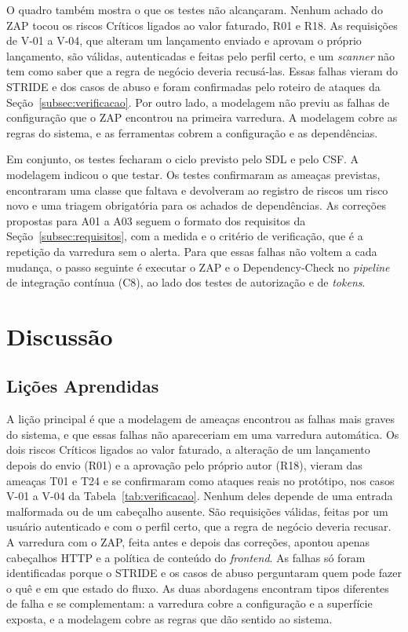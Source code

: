 \documentclass[conference]{IEEEtran}
\begin{document}
O quadro também mostra o que os testes não alcançaram. Nenhum achado do ZAP tocou os riscos Críticos ligados ao valor faturado, R01 e R18. As requisições de V-01 a V-04, que alteram um lançamento enviado e aprovam o próprio lançamento, são válidas, autenticadas e feitas pelo perfil certo, e um \textit{scanner} não tem como saber que a regra de negócio deveria recusá-las. Essas falhas vieram do STRIDE e dos casos de abuso e foram confirmadas pelo roteiro de ataques da Seção~\ref{subsec:verificacao}. Por outro lado, a modelagem não previu as falhas de configuração que o ZAP encontrou na primeira varredura. A modelagem cobre as regras do sistema, e as ferramentas cobrem a configuração e as dependências.

Em conjunto, os testes fecharam o ciclo previsto pelo SDL e pelo CSF. A modelagem indicou o que testar. Os testes confirmaram as ameaças previstas, encontraram uma classe que faltava e devolveram ao registro de riscos um risco novo e uma triagem obrigatória para os achados de dependências. As correções propostas para A01 a A03 seguem o formato dos requisitos da Seção~\ref{subsec:requisitos}, com a medida e o critério de verificação, que é a repetição da varredura sem o alerta. Para que essas falhas não voltem a cada mudança, o passo seguinte é executar o ZAP e o Dependency-Check no \textit{pipeline} de integração contínua (C8), ao lado dos testes de autorização e de \textit{tokens}.


\section{Discussão}
\label{sec:discussao}

\subsection{Lições Aprendidas}
\label{subsec:licoes}

A lição principal é que a modelagem de ameaças encontrou as falhas mais graves do sistema, e que essas falhas não apareceriam em uma varredura automática. Os dois riscos Críticos ligados ao valor faturado, a alteração de um lançamento depois do envio (R01) e a aprovação pelo próprio autor (R18), vieram das ameaças T01 e T24 e se confirmaram como ataques reais no protótipo, nos casos V-01 a V-04 da Tabela~\ref{tab:verificacao}. Nenhum deles depende de uma entrada malformada ou de um cabeçalho ausente. São requisições válidas, feitas por um usuário autenticado e com o perfil certo, que a regra de negócio deveria recusar. A varredura com o ZAP, feita antes e depois das correções, apontou apenas cabeçalhos HTTP e a política de conteúdo do \textit{frontend}. As falhas só foram identificadas porque o STRIDE e os casos de abuso perguntaram quem pode fazer o quê e em que estado do fluxo. As duas abordagens encontram tipos diferentes de falha e se complementam: a varredura cobre a configuração e a superfície exposta, e a modelagem cobre as regras que dão sentido ao sistema.
\end{document}
